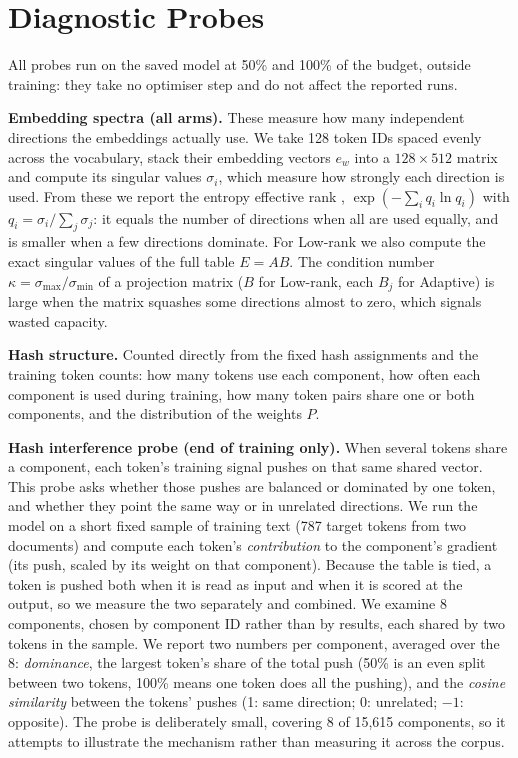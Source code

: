 \documentclass[10pt,a4paper]{article}
\begin{document}
\section{Diagnostic Probes}
\label{app:probes}
All probes run on the saved model at 50\% and 100\% of the budget, outside training: they take no
optimiser step and do not affect the reported runs.

\textbf{Embedding spectra (all arms).} These measure how many independent directions the embeddings
actually use. We take 128 token IDs spaced evenly across the vocabulary, stack their embedding vectors
$e_w$ into a $128\times512$ matrix and compute its singular values $\sigma_i$, which measure how
strongly each direction is used. From these we report the entropy effective rank
\citep{roy2007effrank}, $\exp(-\sum_i q_i\ln q_i)$ with $q_i=\sigma_i/\sum_j\sigma_j$: it equals the
number of directions when all are used equally, and is smaller when a few directions dominate. For
Low-rank we also compute the exact singular values of the full table $E=AB$. The condition number
$\kappa=\sigma_{\max}/\sigma_{\min}$ of a projection matrix ($B$ for Low-rank, each $B_j$ for Adaptive)
is large when the matrix squashes some directions almost to zero, which signals wasted capacity.

\textbf{Hash structure.} Counted directly from the fixed hash assignments and the training token
counts: how many tokens use each component, how often each component is used during training, how many
token pairs share one or both components, and the distribution of the weights $P$.

\textbf{Hash interference probe (end of training only).} When several tokens share a component, each
token's training signal pushes on that same shared vector. This probe asks whether those pushes are
balanced or dominated by one token, and whether they point the same way or in unrelated directions. We
run the model on a short fixed sample of training text (787 target tokens from two documents) and compute
each token's \emph{contribution} to the component's gradient (its push, scaled by its weight on that
component). Because the table is tied, a token is pushed both when it is read as input and when it is
scored at the output, so we measure the two separately and combined. We examine 8 components, chosen by
component ID rather than by results, each shared by two tokens in the sample. We report two numbers per
component, averaged over the 8: \emph{dominance}, the largest token's share of the total push (50\% is an
even split between two tokens, 100\% means one token does all the pushing), and the \emph{cosine
similarity} between the tokens' pushes (1: same direction; 0: unrelated; $-1$: opposite). The probe is
deliberately small, covering 8 of 15,615 components, so it attempts to illustrate the mechanism rather than
measuring it across the corpus.
\end{document}
